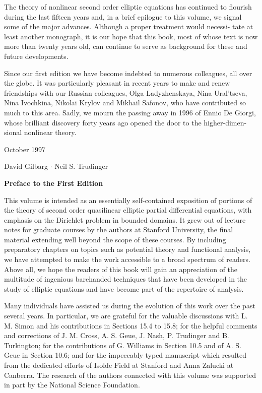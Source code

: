 The theory of nonlinear second order elliptic equations has continued to
flourish during the last fifteen years and, in a brief epilogue to this volume, we
signal some of the major advances. Although a proper treatment would necessi-
tate at least another monograph, it is our hope that this book, most of whose text
is now more than twenty years old, can continue to serve as background for these
and future developments.

Since our first edition we have become indebted to numerous colleagues, all
over the globe. It was particularly pleasant in recent years to make and renew
friendships with our Russian colleagues, Olga Ladyzhenskaya, Nina Ural'tseva,
Nina Ivochkina, Nikolai Krylov and Mikhail Safonov, who have contributed so
much to this area. Sadly, we mourn the passing away in 1996 of Ennio De Giorgi,
whose brilliant discovery forty years ago opened the door to the higher-dimen-
sional nonlinear theory.

October 1997

David Gilbarg $\cdot$ Neil S. Trudinger


\noindent\textbf{Preface to the First Edition}

\medskip

\noindent This volume is intended as an essentially self-contained exposition of portions of the theory of second order quasilinear elliptic partial differential equations, with emphasis on the Dirichlet problem in bounded domains. It grew out of lecture notes for graduate courses by the authors at Stanford University, the final material extending well beyond the scope of these courses. By including preparatory chapters on topics such as potential theory and functional analysis, we have attempted to make the work accessible to a broad spectrum of readers. Above all, we hope the readers of this book will gain an appreciation of the multitude of ingenious barehanded techniques that have been developed in the study of elliptic equations and have become part of the repertoire of analysis.

\noindent Many individuals have assisted us during the evolution of this work over the past several years. In particular, we are grateful for the valuable discussions with L. M. Simon and his contributions in Sections 15.4 to 15.8; for the helpful comments and corrections of J. M. Cross, A. S. Geue, J. Nash, P. Trudinger and B. Turkington; for the contributions of G. Williams in Section 10.5 and of A. S. Geue in Section 10.6; and for the impeccably typed manuscript which resulted from the dedicated efforts of Isolde Field at Stanford and Anna Zalucki at Canberra. The research of the authors connected with this volume was supported in part by the National Science Foundation.

